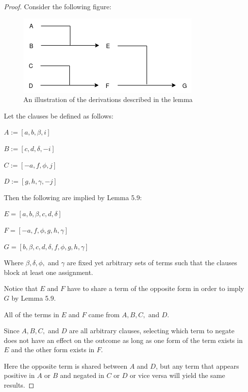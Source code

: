 \documentclass[manuscript]{acmart}
\begin{document}
    \begin{proof}
        Consider the following figure:

        \begin{figure}[h]
            \includegraphics[scale=0.8]{517a.png}
            \caption{An illustration of the derivations described in the lemma}
        \end{figure}

        Let the clauses be defined as follows:

        $A := [a, b, \beta, i]$

        $B := [c, d, \delta, -i]$
        
        $C := [-a, f, \phi, j]$
        
        $D := [g, h, \gamma, -j]$

        Then the following are implied by Lemma 5.9:

        $E = [a, b, \beta, c, d, \delta]$
        
        $F = [-a, f, \phi, g, h, \gamma]$
        
        $G = [b, \beta, c, d, \delta, f, \phi, g, h, \gamma]$
        
        Where $\beta, \delta, \phi,$ and $\gamma$ are fixed yet arbitrary sets of terms such that the clauses block at least one assignment.

        Notice that $E$ and $F$ have to share a term of the opposite form in order to imply $G$ by Lemma 5.9. 
        
        All of the terms in $E$ and $F$ came from $A, B, C,$ and $D$. 
        
        Since $A, B, C,$ and $D$ are all arbitrary clauses, selecting which term to negate does not have an effect on the outcome as long as one form of the term exists in $E$ and the other form exists in $F$.
        
        Here the opposite term is shared between $A$ and $D$, but any term that appears positive in $A$ or $B$ and negated in $C$ or $D$ or vice versa will yield the same results.
 

\end{proof}
\end{document}
